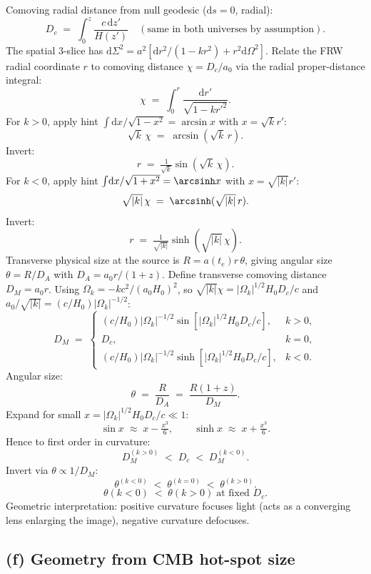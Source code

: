 \documentclass[11pt]{article}
\newcommand{\de}{\mathrm{d}}
\begin{document}
Comoving radial distance from null geodesic ($\de s=0$, radial):
\[
D_c \;=\; \int_0^z\!\frac{c\,\de z'}{H(z')}\quad(\text{same in both universes by assumption}).
\]
The spatial 3-slice has $\de\Sigma^2=a^2[\de r^2/(1-kr^2)+r^2\de\Omega^2]$. Relate the FRW radial coordinate $r$ to comoving distance $\chi=D_c/a_0$ via the radial proper-distance integral:
\[
\chi \;=\; \int_0^r\!\frac{\de r'}{\sqrt{1-k r'^2}}.
\]
For $k>0$, apply hint $\int\!\de x/\sqrt{1-x^2}=\arcsin x$ with $x=\sqrt{k}r'$:
\[
\sqrt{k}\,\chi \;=\; \arcsin(\sqrt{k}\,r).
\]
Invert:
\[
r \;=\; \tfrac{1}{\sqrt{k}}\sin(\sqrt{k}\,\chi).
\]
For $k<0$, apply hint $\int\!\de x/\sqrt{1+x^2}=\arcsinh x$ with $x=\sqrt{|k|}r'$:
\[
\sqrt{|k|}\,\chi \;=\; \arcsinh(\sqrt{|k|}\,r).
\]
Invert:
\[
r \;=\; \tfrac{1}{\sqrt{|k|}}\sinh(\sqrt{|k|}\,\chi).
\]
Transverse physical size at the source is $R = a(t_e)r\,\theta$, giving angular size $\theta = R/D_A$ with $D_A=a_0 r/(1+z)$. Define transverse comoving distance $D_M=a_0 r$. Using $\Omega_k = -kc^2/(a_0 H_0)^2$, so $\sqrt{|k|}\chi=|\Omega_k|^{1/2}H_0 D_c/c$ and $a_0/\sqrt{|k|}=(c/H_0)|\Omega_k|^{-1/2}$:
\[
D_M \;=\; \begin{cases}
(c/H_0)|\Omega_k|^{-1/2}\sin\!\left[|\Omega_k|^{1/2}H_0 D_c/c\right], & k>0,\\
D_c, & k=0,\\
(c/H_0)|\Omega_k|^{-1/2}\sinh\!\left[|\Omega_k|^{1/2}H_0 D_c/c\right], & k<0.
\end{cases}
\]
Angular size:
\[
\theta \;=\; \frac{R}{D_A} \;=\; \frac{R(1+z)}{D_M}.
\]
Expand for small $x=|\Omega_k|^{1/2}H_0 D_c/c\ll 1$:
\[
\sin x \;\approx\; x - \tfrac{x^3}{6},\qquad \sinh x \;\approx\; x + \tfrac{x^3}{6}.
\]
Hence to first order in curvature:
\[
D_M^{(k>0)} \;<\; D_c \;<\; D_M^{(k<0)}.
\]
Invert via $\theta\propto 1/D_M$:
\[
\theta^{(k<0)} \;<\; \theta^{(k=0)} \;<\; \theta^{(k>0)}.
\]
\begin{equation}
\boxed{\;\theta(k<0) \;<\; \theta(k>0)\;\text{at fixed }D_c.\;}
\label{eq:thetacurv}
\end{equation}
Geometric interpretation: positive curvature focuses light (acts as a converging lens enlarging the image), negative curvature defocuses.

\subsection*{(f) Geometry from CMB hot-spot size}
\end{document}
